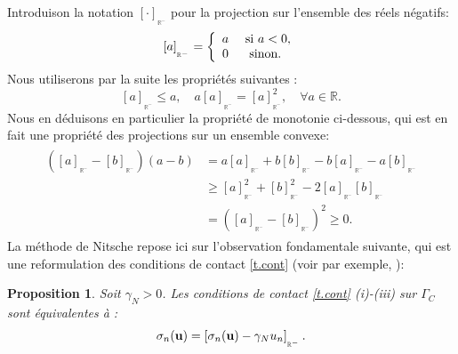 \documentclass[11pt]{book}
\newtheorem{proposition}[theorem]{Proposition}
\newcommand{\bp}{\begin{proposition}}
\newcommand{\ep}{\end{proposition}}
\newcommand{\pf}{\textbf{Preuve : }}
\def\u{{\bf u}}
\newcommand{\R}{\mathbb{R}}
\newcommand{\pn}[1]{\left [ #1 \right ]_{_{\R^-}}}
\begin{document}
Introduison la notation $\pn{\cdot}$ pour la projection sur l'ensemble des réels négatifs:
 \[
 \pn{a}  =
 \left \{ \begin{array}{cc}
 a & \hbox{ si } a < 0,\\
 0 & \hbox{ sinon. }
 \end{array}
 \right.
 \]
Nous utiliserons par la suite les propriétés suivantes :
\begin{equation}
\label{plusprop}
 \pn{a} \leq a, \quad a \pn{ a } = \pn{a}^2, \quad \forall a \in \R.
\end{equation}
Nous en déduisons en particulier la propriété de monotonie ci-dessous, qui est en fait une propriété des projections sur un ensemble convexe:
 \begin{align}
 \begin{aligned}
 (\pn{a} - \pn{b})(a-b) & =  a\pn{a} + b\pn{b} -b\pn{a} -a\pn{b}\\
 & \geq  \pn{a}^2 + \pn{b}^2 - 2\pn{a} \pn{b} \\ & =  ( \pn{a} - \pn{b} )^2 \geq 0.
\end{aligned}
\label{a+b+}
\end{align}
La méthode de Nitsche repose ici sur l'observation fondamentale suivante, qui est une reformulation des conditions de contact \eqref{t.cont} (voir par exemple, \cite{alart-curnier-88}):
% 
 \bp
 Soit $\gamma_N > 0$. Les conditions de contact \eqref{t.cont} (i)-(iii) sur $\Gamma_C$ sont équivalentes à :
 \begin{equation}
 \sigma_n(\u) =  \pn{ \sigma_n (\u) - \gamma_N u_n}.
 \label{t.contnitsche} 
 \end{equation}
 \ep
% 
\end{document}
